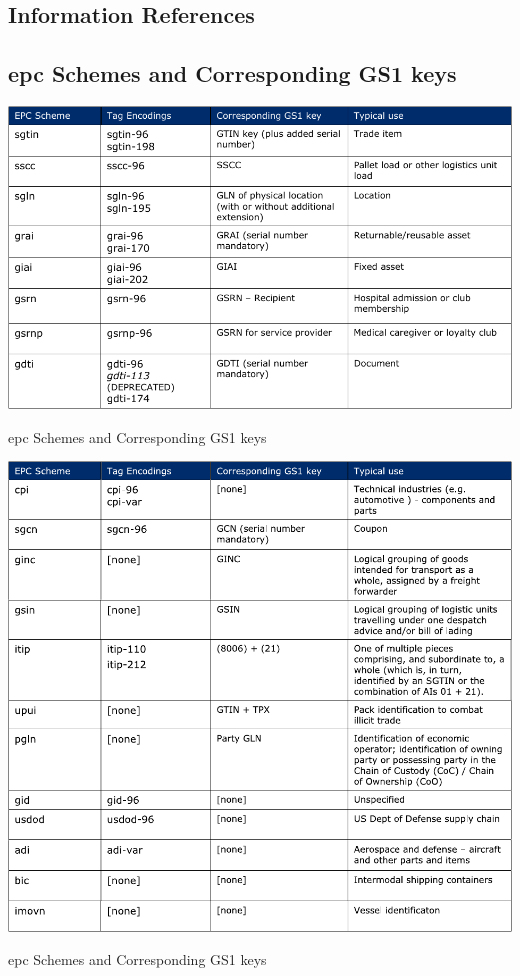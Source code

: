 \renewcommand{\thesection}{\Alph{section}}

\begin{appendices}
\chapter{Information References}

\section{\ac{epc} Schemes and Corresponding GS1 keys} \label{anx:epccodingschemes}
\begin{table}[!ht]
    \centering
    \includegraphics[width=\textwidth]{./figs/02-state-of-the-art/epcschemes.pdf}
    \caption{\ac{epc} Schemes and Corresponding GS1 keys}
\end{table}

\begin{table}
    \centering
    \includegraphics[width=\textwidth]{./figs/02-state-of-the-art/epcschemes2.pdf}
    \caption{\ac{epc} Schemes and Corresponding GS1 keys~\cite{EPCTagData}}
\end{table}


\end{appendices}
